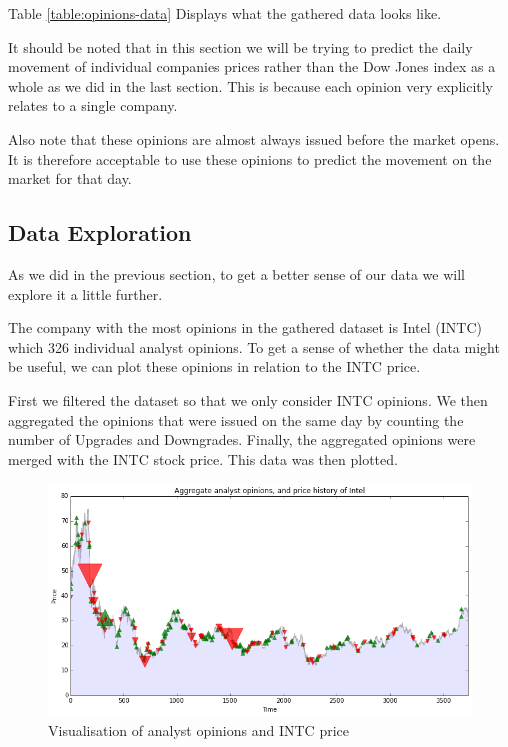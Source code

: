\documentclass{report}
\begin{document}
Table \ref{table:opinions-data} Displays what the gathered data looks like.

It should be noted that in this section we will be trying to predict the daily movement of individual companies prices rather than the Dow Jones index as a whole as we did in the last section. This is because each opinion very explicitly relates to a single company.

Also note that these opinions are almost always issued before the market opens. It is therefore acceptable to use these opinions to predict the movement on the market for that day.

\subsection{Data Exploration}

As we did in the previous section, to get a better sense of our data we will explore it a little further.

The company with the most opinions in the gathered dataset is Intel (INTC) which 326 individual analyst opinions. To get a sense of whether the data might be useful, we can plot these opinions in relation to the INTC price.

First we filtered the dataset so that we only consider INTC opinions. We then aggregated the opinions that were issued on the same day by counting the number of Upgrades and Downgrades. Finally, the aggregated opinions were merged with the INTC stock price. This data was then plotted.

\begin{figure}[H]
	\caption{Visualisation of analyst opinions and INTC price}
	\centerline{\includegraphics[scale=0.5]{vis/analyst_opinions.png}}
	\label{fig:opinions_vis}
\end{figure} 
\end{document}
